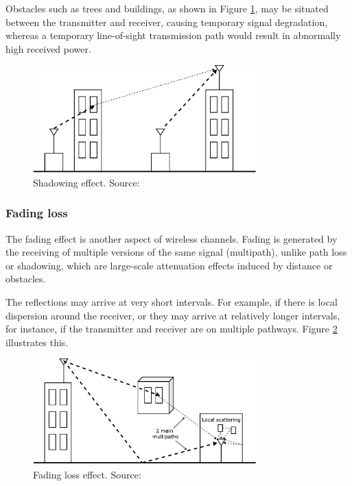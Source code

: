 Obstacles such as trees and buildings, as shown in Figure \ref{fig:pathloss}, may be situated between the 
transmitter and receiver, causing temporary signal degradation, whereas a temporary line-of-sight 
transmission path would result in abnormally high received power.

\begin{figure}[]
  \centering
  \includegraphics[width=0.77\textwidth]{img/pathloss.png}
  \caption{Shadowing effect. Source:\cite{lte2} }
  \label{fig:pathloss}
\end{figure}

\subsubsection{Fading loss} 

The fading effect is another aspect of wireless channels. Fading is generated by the receiving 
of multiple versions of the same signal (multipath), unlike path loss or shadowing, which are large-scale 
attenuation effects induced by distance or obstacles.

The reflections may arrive at very short intervals. For example, if there is local dispersion 
around the receiver, or they may arrive at relatively longer intervals, for instance, if the 
transmitter and receiver are on multiple pathways. Figure \ref{fig:fading} illustrates this.

\begin{figure}[]
  \centering
  \includegraphics[width=0.77\textwidth]{img/fading.png}
  \caption{Fading loss effect. Source:\cite{lte2} }
  \label{fig:fading}
\end{figure}

